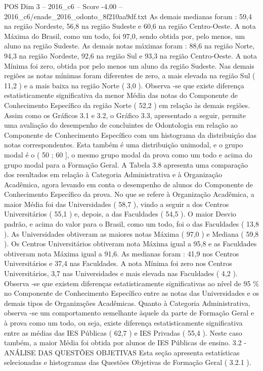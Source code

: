 \begin{textsample}{POS Dim 3 – 2016\_c6 – Score -4.00 – 2016\_c6/enade\_2016\_odonto\_8f210aa9df.txt}
As demais medianas foram : 59,4 na região Nordeste, 56,8 na região Sudeste e 60,6 na região Centro-Oeste.
A nota Máxima do Brasil, como um todo, foi 97,0, sendo obtida por, pelo menos, um aluno na região Sudeste.
As demais notas máximas foram : 88,6 na região Norte, 94,3 na região Nordeste, 92,6 na região Sul e 93,3 na região Centro-Oeste.
A nota Mínima foi zero, obtida por pelo menos um aluno da região Sudeste.
Nas demais regiões as notas mínimas foram diferentes de zero, a mais elevada na região Sul ( 11,2 ) e a mais baixa na região Norte ( 3,0 ).
Observa -se que existe diferença estatisticamente significativa da menor Média das notas do Componente de Conhecimento Específico da região Norte ( 52,2 ) em relação às demais regiões.
Assim como os Gráficos 3.1 e 3.2, o Gráfico 3.3, apresentado a seguir, permite uma avaliação do desempenho de concluintes de Odontologia em relação ao Componente de Conhecimento Específico com um histograma da distribuição das notas correspondentes.
Esta também é uma distribuição unimodal, e o grupo modal é o ( 50 ; 60 ], o mesmo grupo modal da prova como um todo e acima do grupo modal para a Formação Geral.
A Tabela 3.8 apresenta uma comparação dos resultados em relação à Categoria Administrativa e à Organização Acadêmica, agora levando em conta o desempenho de alunos do Componente de Conhecimento Específico da prova.
No que se refere à Organização Acadêmica, a maior Média foi das Universidades ( 58,7 ), vindo a seguir a dos Centros Universitários ( 55,1 ) e, depois, a das Faculdades ( 54,5 ).
O maior Desvio padrão, e acima do valor para o Brasil, como um todo, foi o das Faculdades ( 13,8 ).
As Universidades obtiveram as maiores notas Máxima ( 97,0 ) e Mediana ( 59,8 ).
Os Centros Universitários obtiveram nota Máxima igual a 95,8 e as Faculdades obtiveram nota Máxima igual a 91,6.
As medianas foram : 41,9 nos Centros Universitários e 37,4 nas Faculdades.
A nota Mínima foi zero nos Centros Universitários, 3,7 nas Universidades e mais elevada nas Faculdades ( 4,2 ).
Observa -se que existem diferenças estatisticamente significativas ao nível de 95 \% no Componente de Conhecimento Específico entre as notas das Universidades e os demais tipos de Organizações Acadêmicas.
Quanto à Categoria Administrativa, observa -se um comportamento semelhante àquele da parte de Formação Geral e à prova como um todo, ou seja, existe diferença estatisticamente significativa entre as médias das IES Públicas ( 62,7 ) e IES Privadas ( 55,4 ).
Neste caso também, a maior Média foi obtida por alunos de IES Públicas de ensino. 3.2 - ANÁLISE DAS QUESTÕES OBJETIVAS Esta seção apresenta estatísticas selecionadas e histogramas das Questões Objetivas de Formação Geral ( 3.2.1 ).

\end{textsample}
